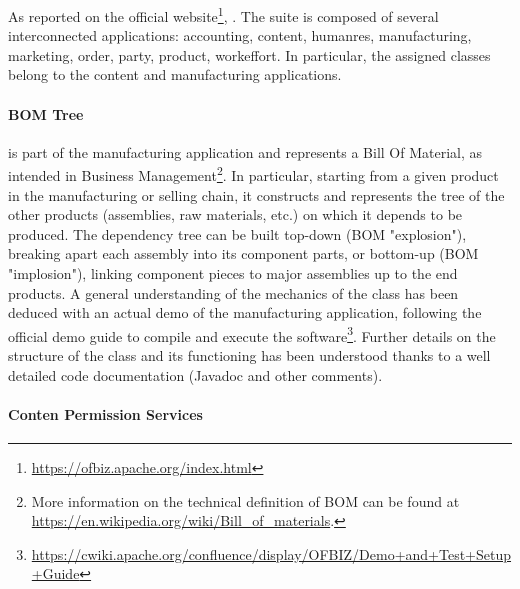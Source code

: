 As reported on the official website\footnote{\url{https://ofbiz.apache.org/index.html}}, .\newline
The suite is composed of several interconnected applications:
accounting,
content,
humanres,
manufacturing,
marketing,
order,
party,
product,
workeffort.\newline
In particular, the assigned classes belong to the content and manufacturing applications.

\paragraph{BOM Tree} is part of the manufacturing application and represents a Bill Of Material, as intended in Business Management\footnote{More information on the technical definition of BOM can be found at \url{https://en.wikipedia.org/wiki/Bill_of_materials}.}. In particular, starting from a given product in the manufacturing or selling chain, it constructs and represents the tree of the other products (assemblies, raw materials, etc.) on which it depends to be produced. The dependency tree can be built top-down (BOM "explosion"), breaking apart each assembly into its component parts, or bottom-up (BOM "implosion"), linking component pieces to major assemblies up to the end products.\newline
A general understanding of the mechanics of the class has been deduced with an actual demo of the manufacturing application, following the official demo guide to compile and execute the software\footnote{\url{https://cwiki.apache.org/confluence/display/OFBIZ/Demo+and+Test+Setup+Guide}}. Further details on the structure of the class and its functioning has been understood thanks to a well detailed code documentation (Javadoc and other comments).


\paragraph{Conten Permission Services} %